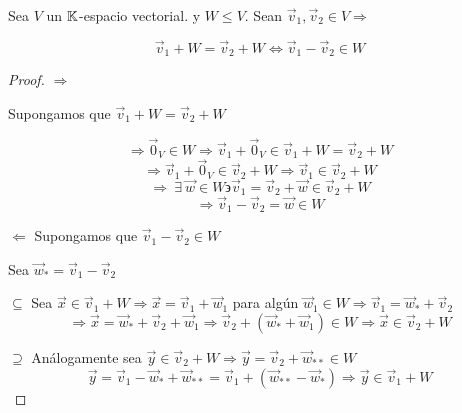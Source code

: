 \begin{theorem}
    Sea $V$ un $\mathbb{K}$-espacio vectorial. y $W \leq V$. Sean ${\vec{v}}_{1}, {\vec{v}}_{2} \in V \Rightarrow$

    \begin{equation*}
        {\vec{v}}_{1}+W = {\vec{v}}_{2} + W \iff   {\vec{v}}_{1} -  {\vec{v}}_{2} \in W
    \end{equation*}
\end{theorem}

\begin{proof}
    $\Rightarrow$ 
    
    Supongamos que ${\vec{v}}_{1}+W = {\vec{v}}_{2} + W$

    \begin{equation*}
        \Rightarrow {\vec{0}}_{V} \in W \Rightarrow {\vec{v}}_{1} + {\vec{0}}_{V} \in {\vec{v}}_{1}+W = {\vec{v}}_{2} + W
    \end{equation*}
    \begin{equation*}
        \Rightarrow {\vec{v}}_{1} + {\vec{0}}_{V} \in {\vec{v}}_{2} + W \Rightarrow {\vec{v}}_{1}  \in {\vec{v}}_{2} + W 
    \end{equation*}
    \begin{equation*}
        \Rightarrow \: \exists \: \vec{w} \in W \backepsilon {\vec{v}}_{1} = {\vec{v}}_{2} + \vec{w} \in {\vec{v}}_{2} + W
    \end{equation*}
    \begin{equation*}
        \Rightarrow {\vec{v}}_{1} -  {\vec{v}}_{2} = \vec{w} \in W
    \end{equation*}

    $\Leftarrow$ Supongamos que ${\vec{v}}_{1} -  {\vec{v}}_{2} \in W$

    Sea ${\vec{w}}_{*} = {\vec{v}}_{1} -  {\vec{v}}_{2}$

    $\subseteq$ Sea $\vec{x} \in {\vec{v}}_{1} + W \Rightarrow \vec{x} = {\vec{v}}_{1}+{\vec{w}}_{1}$ para algún ${\vec{w}}_{1} \in W \Rightarrow {\vec{v}}_{1} = {\vec{w}}_{*} + {\vec{v}}_{2}$
    \begin{equation*}
        \Rightarrow  \vec{x} = {\vec{w}}_{*} + {\vec{v}}_{2}+{\vec{w}}_{1} \Rightarrow {\vec{v}}_{2} + ({\vec{w}}_{*}+{\vec{w}}_{1}) \in W \Rightarrow \vec{x} \in {\vec{v}}_{2} + W 
    \end{equation*}

    $\supseteq$ Análogamente sea $\vec{y} \in {\vec{v}}_{2} + W \Rightarrow \vec{y} = {\vec{v}}_{2} + {\vec{w}}_{**} \in W$
    \begin{equation*}
        \vec{y} = {\vec{v}}_{1} - {\vec{w}}_{*}  + {\vec{w}}_{**} = {\vec{v}}_{1} + ({\vec{w}}_{**}  - {\vec{w}}_{*})  \Rightarrow  \vec{y} \in {\vec{v}}_{1} + W  \end{equation*}
\end{proof}

